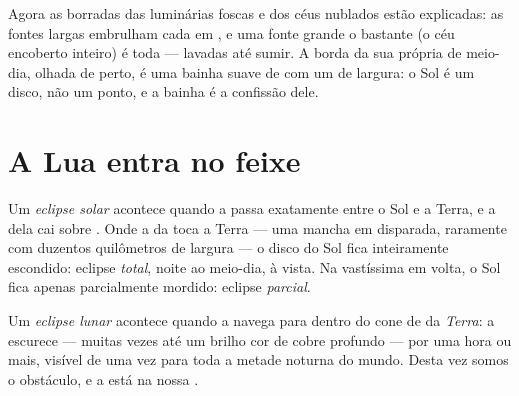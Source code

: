 \begin{example}\label{ex:g7:shadows-eclipses:soft}
Agora as  borradas das luminárias foscas e dos céus nublados
estão explicadas: as fontes largas embrulham cada  em ,
e uma fonte grande o bastante (o céu encoberto inteiro) é toda
 ---  lavadas até sumir. A borda da sua própria 
de meio-dia, olhada de perto, é uma bainha suave de  com um
 de largura: o Sol é um disco, não um ponto, e a bainha é a
confissão dele.
\end{example}

\section{A Lua entra no feixe}

\begin{definition}\label{def:g7:shadows-eclipses:solar}
Um \emph{eclipse solar} acontece quando a 
passa exatamente entre o Sol e a Terra, e a  dela cai sobre
. Onde a \emph{} da  toca a Terra --- uma mancha em
disparada, raramente com duzentos quilômetros de largura --- o disco
do Sol fica inteiramente escondido: eclipse \emph{total}, noite ao
meio-dia,  à vista. Na vastíssima \emph{} em volta, o
Sol fica apenas parcialmente mordido: eclipse \emph{parcial}.
\end{definition}

\begin{definition}\label{def:g7:shadows-eclipses:lunar}
Um \emph{eclipse lunar} acontece quando a
\emph{} navega para dentro do cone de  da \emph{Terra}: a
 escurece --- muitas vezes até um brilho cor de cobre
profundo --- por uma hora ou mais, visível de uma vez para toda a
metade noturna do mundo. Desta vez somos  o obstáculo, e a 
está na nossa .
\end{definition}

